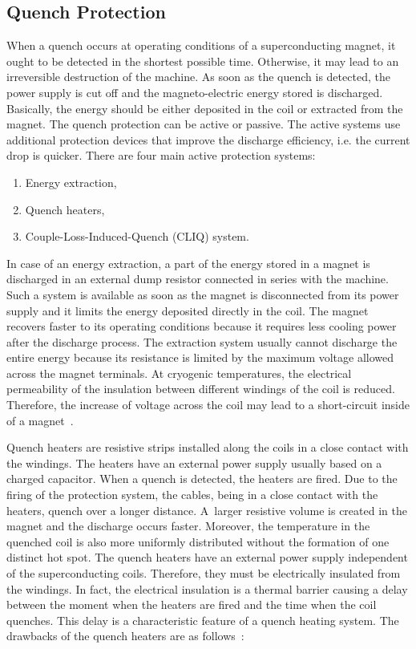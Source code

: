 \subsection{Quench Protection}

When a quench occurs at operating conditions of a superconducting magnet, it ought to be detected in the shortest possible time. Otherwise, it may lead to an irreversible destruction of the machine. As soon as the quench is detected, the power supply is cut off and the magneto-electric energy stored is discharged. Basically, the energy should be either deposited in the coil or extracted from the magnet. The quench protection can be active or passive. The active systems use additional protection devices that improve the discharge efficiency, i.e. the current drop is quicker. There are four main active protection systems: 

\begin{enumerate}
	\item Energy extraction,
	\item Quench heaters,
	\item Couple-Loss-Induced-Quench (CLIQ) system. 
\end{enumerate}

In case of an energy extraction, a part of the energy stored in a magnet is discharged in an external dump resistor connected in series with the machine. Such a system is available as soon as the magnet is disconnected from its power supply and it limits the energy deposited directly in the coil. The magnet recovers faster to its operating conditions because it requires less cooling power after the discharge process. The extraction system usually cannot discharge the entire energy because its resistance is limited by the maximum voltage allowed across the magnet terminals. At cryogenic temperatures, the electrical permeability of the insulation between different windings of the coil is reduced. Therefore, the increase of voltage across the coil may lead to a short-circuit inside of a magnet~\cite{salmiquenchheateroptimization}. 

Quench heaters are resistive strips installed along the coils in a close contact with the windings. The heaters have an external power supply usually based on a charged capacitor. When a quench is detected, the heaters are fired. Due to the firing of the protection system, the cables, being in a close contact with the heaters, quench over a longer distance. A~larger resistive volume is created in the magnet and the discharge occurs faster. Moreover, the temperature in the quenched coil is also more uniformly distributed without the formation of one distinct hot spot. The quench heaters have an external power supply independent of the superconducting coils. Therefore, they must be electrically insulated from the windings. In fact, the electrical insulation is a thermal barrier causing a delay between the moment when the heaters are fired and the time when the coil quenches. This delay is a characteristic feature of a quench heating system. The drawbacks of the quench heaters are as follows~\cite{salmiquenchheateroptimization}: 


